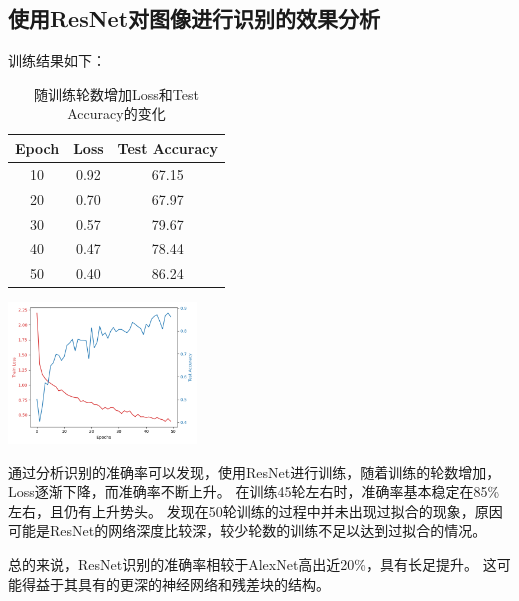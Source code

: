 \subsection{使用ResNet对图像进行识别的效果分析}
训练结果如下：
\begin{table}[H]
    \begin{minipage}[b]{0.56\linewidth}
    \centering
    \begin{tabular}{c|c|c}
        \hline
        Epoch & Loss & Test Accuracy \\ \hline \hline
        10 & 0.92 & 67.15 \\ \hline
        20 & 0.70 & 67.97 \\ \hline
        30 & 0.57 & 79.67 \\ \hline
        40 & 0.47 & 78.44 \\ \hline
        50 & 0.40 & 86.24 \\ \hline
       \end{tabular}
        \caption{随训练轮数增加Loss和Test Accuracy的变化}
    \end{minipage}
    \begin{minipage}[b]{0.4\linewidth}
    \centering
    \includegraphics[width=50mm]{../../ResNet/ResNet.png}
    \end{minipage}
    \end{table}

通过分析识别的准确率可以发现，使用ResNet进行训练，随着训练的轮数增加，Loss逐渐下降，而准确率不断上升。
在训练45轮左右时，准确率基本稳定在85\%左右，且仍有上升势头。
发现在50轮训练的过程中并未出现过拟合的现象，原因可能是ResNet的网络深度比较深，较少轮数的训练不足以达到过拟合的情况。 \par
总的来说，ResNet识别的准确率相较于AlexNet高出近20\%，具有长足提升。
这可能得益于其具有的更深的神经网络和残差块的结构。
